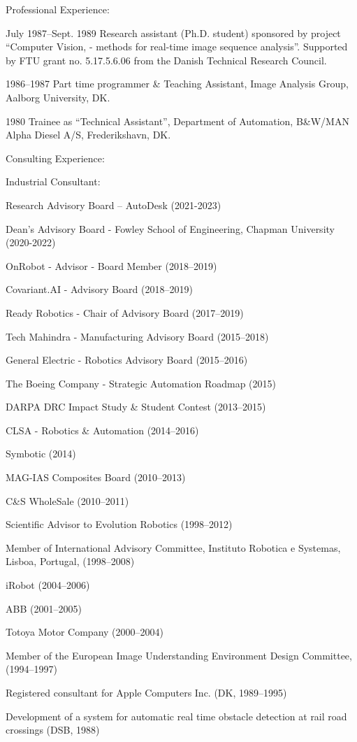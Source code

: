 \documentclass{article}
\newenvironment{sublist}{%
  \begin{list}{}{%
      \setlength{\itemsep}{0em}\setlength{\parsep}{0em}%
      \setlength{\topsep}{0em}\setlength{\parskip}{0em}%
    }%
}%
{ \end{list} }
\begin{document}
\begin{cv}
\begin{cvlist}{Professional Experience:}
\item[July 1987--Sept. 1989] Research assistant (Ph.D. student) sponsored
  by project ``Computer Vision, - methods for real-time image
  sequence analysis''. Supported by FTU grant no. 5.17.5.6.06 from the
  Danish Technical Research Council.

\item[1986--1987] Part time programmer \& Teaching Assistant,
  Image Analysis Group, Aalborg University, DK.

\item[1980] Trainee as ``Technical Assistant'', Department of
  Automation, B\&W/MAN Alpha Diesel A/S, Frederikshavn, DK.
\end{cvlist}

\begin{cvlist}{Consulting Experience:}
\item Industrial Consultant:
  \begin{sublist}
  \item Research Advisory Board -- AutoDesk (2021-2023)
  \item Dean's Advisory Board - Fowley School of Engineering, Chapman University (2020-2022)
  \item OnRobot - Advisor - Board Member (2018--2019)
  \item Covariant.AI - Advisory Board (2018--2019)
  \item Ready Robotics - Chair of Advisory Board (2017--2019)
  \item Tech Mahindra - Manufacturing Advisory Board (2015--2018)
  \item General Electric - Robotics Advisory Board (2015--2016)
  \item The Boeing Company - Strategic Automation Roadmap (2015)
  \item DARPA DRC Impact Study \& Student Contest (2013--2015)
  \item CLSA - Robotics \& Automation (2014--2016)
  \item Symbotic (2014)
  \item MAG-IAS Composites Board (2010--2013)
  \item C\&S WholeSale (2010--2011)
  \item Scientific Advisor to Evolution Robotics (1998--2012)
  \item Member of International Advisory Committee, Instituto Robotica e
    Systemas, Lisboa, Portugal, (1998--2008)
  \item iRobot (2004--2006)
  \item ABB (2001--2005)
  \item Totoya Motor Company (2000--2004)
  \item Member of the European Image Understanding Environment Design
    Committee, (1994--1997)
  \item Registered consultant for Apple Computers Inc. (DK, 1989--1995)
  \item Development of a system for automatic real time obstacle
    detection at rail road crossings (DSB, 1988)
  \end{sublist}
\end{cvlist}


\end{cv}
\end{document}
